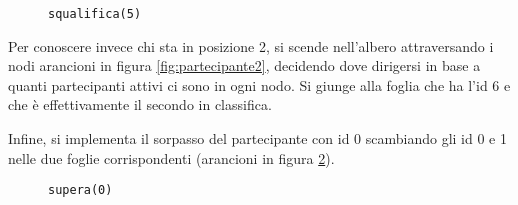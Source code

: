 \begin{figure} [htbp]
	\centering
	  \begin{minipage}{0.49\textwidth}
	
	\caption{\texttt{inizia}}%
	\label{fig:inizia}
	\end{minipage}
	\begin{minipage}{0.49\textwidth}
	
	\caption{\texttt{squalifica(5)}} %
	\label{fig:squalifica5}
	\end{minipage}
\end{figure}

Per conoscere invece chi sta in posizione 2, si scende nell'albero attraversando i nodi \color{orange} arancioni \color{black} in figura \ref{fig:partecipante2}, decidendo dove dirigersi in base a quanti partecipanti attivi ci sono in ogni nodo. Si giunge alla foglia che ha l'id 6 e che è effettivamente il secondo in classifica.

Infine, si implementa il sorpasso del partecipante con id 0 scambiando gli id 0 e 1 nelle due foglie corrispondenti (\color{orange}arancioni \color{black} in figura \ref{fig:supera0}).


% 	

\begin{figure} [htbp]
	\centering
	\begin{minipage}{0.49\textwidth}
	
	\caption{\texttt{partecipante(2)}} %
	\label{fig:partecipante2}
	\end{minipage}
	\begin{minipage}{0.49\textwidth}
	
	\caption{\texttt{supera(0)}} %
	\label{fig:supera0}
	\end{minipage}
\end{figure}


